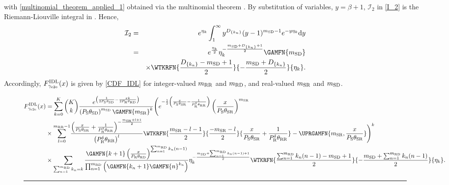 \documentclass[10pt,journal]{IEEEtran}
\begin{document}
with \eqref{multinomial_theorem_applied_1} obtained via the multinomial theorem \cite[Section 24.1.2]{abramowitz_stegun}. By substitution of variables, $y=\beta+1$, $\mathcal{I}_2$ in \eqref{I_2} is the Riemann-Liouville integral in \cite[Eq. 3.383-4]{gradshteyn_ryzhik}. Hence,
\begin{eqnarray}
\mathcal{I}_2
&=&e^{\eta_k}\int_1^\infty y^{D_{\{k_n\}}}(y-1)^{\msd-1}e^{-y\eta_k} \mathrm{d}y\nonumber\\
&=&e^{\frac{\eta_k}{2}}\eta_k^{-\frac{\msd+D_{\{k_n\}}+1}{2}}\GAMFN{\msd}\nonumber\\
&& \times \WTKRFN{\frac{D_{\{k_n\}} -\msd+1}{2}}{-\frac{\msd+D_{\{k_n\}}}{2}}{\eta_k}.
\end{eqnarray}
Accordingly, $F_{\gamma_{\rm e2e}}^{\text{IDL}}(x)$ is given by \eqref{CDF_IDL} for integer-valued ${m_{{\rm R} {\rm R}}}$ and ${m_{{\rm R} {\rm D}}}$, and real-valued ${m_{{\rm S} {\rm R}}}$ and ${m_{{\rm S} {\rm D}}}$.
\begin{figure*}
\centering
\begin{footnotesize}
\begin{equation}
\begin{split}
\CDFIDL
&=\sum_{k=0}^K {K \choose k} \frac{e^{\left(\frac{1}{2\PS\thetasd}-\frac{\RVval k}{2\PR\thetard}\right)}}{\left(\PS\thetasd\right)^{\msd}\GAMFN{\msr}^k}
\Bigg(e^{-\frac{1}{2}\left(\frac{\RVval}{\PS\thetasr}-\frac{1}{\PR^\PWRSCL\thetarr}\right)}\left(\frac{\RVval}{\PS\thetasr}\right)^{\msr}
\\&\times
{\displaystyle\sum_{l=0}^{\mrr-1}} \frac{\left(\frac{\RVval}{\PS\thetasr}+\frac{1}{\PR^\PWRSCL\thetarr}\right)^{-\frac{\msr+l+1}{2}}}{\left(\PR^\PWRSCL\thetarr\right)^{l}}
\WTKRFN{\frac{\msr-l-1}{2}}{\frac{-\msr-l}{2}}{\frac{\RVval}{\PS\thetasr}+\frac{1}{\PR^\PWRSCL\thetarr}}        - \UPRGAMFN{\msr,\frac{\RVval}{\PS\thetasr}}
\Bigg)^k\\
&\times \sum_{\sum_{n=1}^{\mrd} k_{n} = k} \frac{\GAMFN{k+1}\left(\frac{\RVval}{\PR\thetard}\right)^{\sum_{n=1}^{\mrd}k_n(n-1)}}{\prod_{n=1}^{\mrd}\left(\GAMFN{k_n+1}\GAMFN{n}^{k_n}\right)} \eta_k^{-\frac{\msd+\sum_{n=1}^{\mrd}k_n(n-1)+1}{2}}
\WTKRFN{\frac{\sum_{n=1}^{\mrd}k_n(n-1) -\msd+1}{2}}{-\frac{\msd+\sum_{n=1}^{\mrd}k_n(n-1)}{2}}{\eta_k}.
\end{split}
\label{CDF_IDL}
\end{equation}
\end{footnotesize}
\hrule
\end{figure*}
\end{document}
